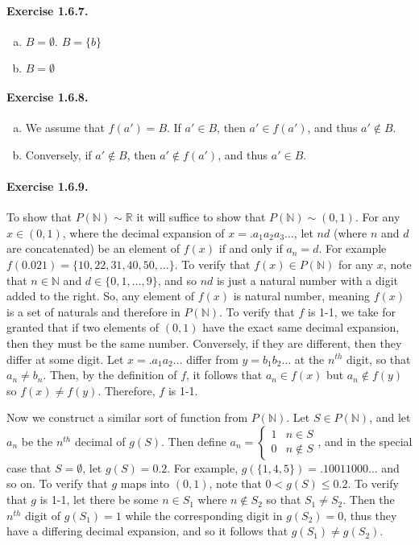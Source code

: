 \documentclass{article}
\newcommand{\N}{\mathbb{N}}
\newcommand{\R}{\mathbb{R}}
\begin{document}
\paragraph{Exercise 1.6.7.}
\begin{enumerate}[(a)]
    \item $B=\emptyset$. $B=\{b\}$
    \item $B=\emptyset$
\end{enumerate}

\paragraph{Exercise 1.6.8.}
\begin{enumerate}[(a)]
    \item We assume that $f(a')=B$. If $a'\in B$, then $a'\in f(a')$, and thus $a'\notin B$.
    \item Conversely, if $a'\notin B$, then $a'\notin f(a')$, and thus $a'\in B$.
\end{enumerate}

\paragraph{Exercise 1.6.9.}
To show that $P(\N)\sim\R$ it will suffice to show that $P(\N)\sim(0,1)$. For any $x\in (0,1)$, where the decimal expansion of $x=.a_1a_2a_3\ldots$, let $nd$ (where $n$ and $d$ are concatenated) be an element of $f(x)$ if and only if $a_n=d$. For example $f(0.021)=\{10,22,31,40,50,\ldots\}$. To verify that $f(x)\in P(\N)$ for any $x$, note that $n\in \N$ and $d\in \{0,1,\ldots,9\}$, and so $nd$ is just a natural number with a digit added to the right. So, any element of $f(x)$ is natural number, meaning $f(x)$ is a set of naturals and therefore in $P(\N)$. To verify that $f$ is 1-1, we take for granted that if two elements of $(0,1)$ have the exact same decimal expansion, then they must be the same number. Conversely, if they are different, then they differ at some digit. Let $x=.a_1a_2\ldots$ differ from $y=b_1b_2\ldots$ at the $n^{th}$ digit, so that $a_n\neq b_n$. Then, by the definition of $f$, it follows that $a_n\in f(x)$ but $a_n \notin f(y)$ so $f(x)\neq f(y)$. Therefore, $f$ is 1-1. 

Now we construct a similar sort of function from $P(\N)$. Let $S\in P(\N)$, and let $a_n$ be the $n^{th}$ decimal of $g(S)$. Then define $a_n=\begin{cases}
    1 & n\in S \\
    0 & n\notin S
\end{cases}$, and in the special case that $S=\emptyset$, let $g(S)=0.2$.
For example, $g(\{1,4,5\})=.10011000\ldots$ and so on. To verify that $g$ maps into $(0,1)$, note that $0<g(S) \leq 0.2$. To verify that $g$ is 1-1, let there be some $n\in S_1$ where $n \notin S_2$ so that $S_1\neq S_2$. Then the $n^{th}$ digit of $g(S_1)=1$ while the corresponding digit in $g(S_2)=0$, thus they have a differing decimal expansion, and so it follows that $g(S_1)\neq g(S_2)$.
\end{document}
